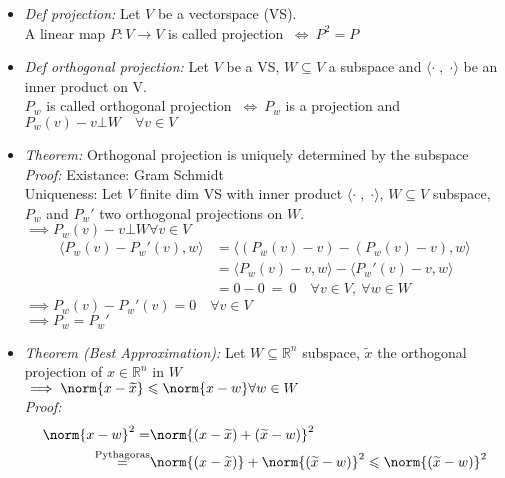 \begin{SolutionSheet}[\ref{sheet1}]
\begin{onehalfspace}
  \begin{Solution}
    \begin{itemize}
      \item \textit{Def projection:} Let $V$ be a vectorspace (VS). \\
        A linear map $P: V \to V$ is called projection $\ \iff \ P^2 = P$
      \item \textit{Def orthogonal projection:} Let $V$ be a VS, $W \subseteq V$ a subspace 
        and $\langle \cdot \; , \; \cdot \rangle$ be an inner product on V. \\
        $P_w$ is called orthogonal projection $\ \iff \ P_w$ is a projection and 
        $P_w(v)-v \bot W \quad \forall v\in V$
      \item \textit{Theorem:} Orthogonal projection is uniquely determined by the subspace \\
        \textit{Proof:} Existance: Gram Schmidt \\
        Uniqueness: Let $V$ finite dim VS with inner product $\langle \cdot \; , \; \cdot \rangle$,
        $W \subseteq V$ subspace, $P_w$ and $P_w'$ two orthogonal projections on $W$. \\
        $\implies P_w(v)-v \bot W \forall v \in V$ 
        \begin{align*}
          \langle P_w(v) - P_w'(v), w \rangle &= \langle (P_w(v) - v) - (P_w(v) - v), w \rangle \\
          &= \langle P_w(v) - v , w \rangle - \langle P_w'(v) - v , w \rangle \\
          &= 0 - 0 \ = \ 0 \quad \forall v\in V, \ \forall w\in W
        \end{align*}
        $\implies P_w(v) - P_w'(v) = 0 \quad \forall v \in V$ \\
        $\implies P_w = P_w'$
      \item \textit{Theorem (Best Approximation):} Let $W \subseteq \mathbb{R}^n$ subspace,
        $\widetilde{x}$ the orthogonal projection of $x \in \mathbb{R}^n$ in $W$ \\
        $\implies \norm{x - \widetilde{x}} \leqslant \norm{x - w} \forall w \in W$ \\
        \textit{Proof:}  
        \begin{align*}
          \norm{x - w}^2 = & \norm{(x - \widetilde{x}) + (\widetilde{x} - w)}^2 \\
          \stackrel{\text{Pythagoras}}{=} & \norm{(x - \widetilde{x})} + \norm{(\widetilde{x} - w)}^2
          \leqslant \norm{(\widetilde{x} - w)}^2

\end{align*}
\end{itemize}
\end{Solution}
\end{onehalfspace}
\end{SolutionSheet}
